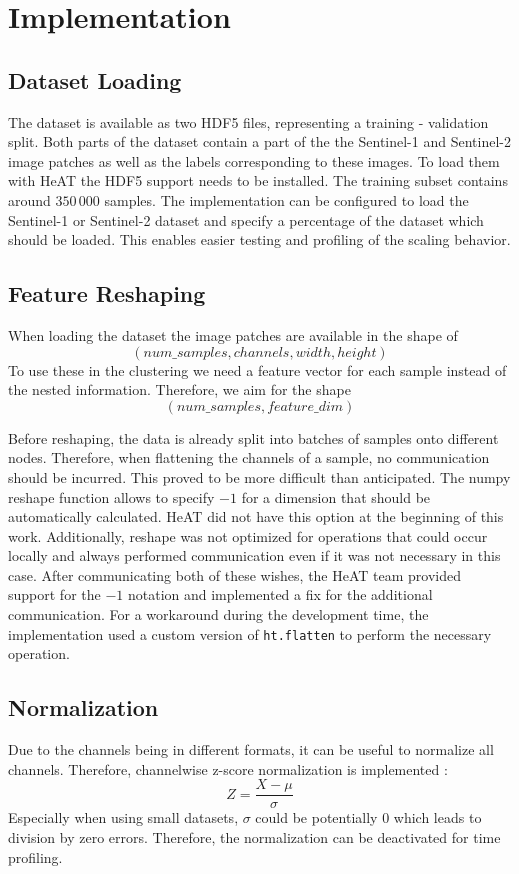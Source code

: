 \section{Implementation}
\label{sec:implementation}

\subsection{Dataset Loading}
\label{subsec:dataset_loading}
The dataset is available as two \gls{HDF5} files, representing a training - validation split.
Both parts of the dataset contain a part of the the Sentinel-1 and Sentinel-2 image patches as well as the labels corresponding to these images.
To load them with \gls{HeAT} the \gls{HDF5} support needs to be installed.
The training subset contains around \(350\,000\) samples.
The implementation can be configured to load the Sentinel-1 or Sentinel-2 dataset and specify a percentage of the dataset which should be loaded.
This enables easier testing and profiling of the scaling behavior.


\subsection{Feature Reshaping}
\label{subsec:feature_reshaping}
When loading the dataset the image patches are available in the shape of \[(num\_samples, channels, width, height)\]
To use these in the clustering we need a feature vector for each sample instead of the nested information. Therefore,
we aim for the shape \[(num\_samples, feature\_dim)\]

Before reshaping, the data is already split into batches of samples onto different nodes. Therefore, when flattening the channels of a sample, no communication should be incurred.
This proved to be more difficult than anticipated. The \gls{numpy} reshape function allows to specify \(-1\) for a dimension that should be automatically calculated.
\gls{HeAT} did not have this option at the beginning of this work.
Additionally, reshape was not optimized for operations that could occur locally and always performed communication even
if it was not necessary in this case. After communicating both of these wishes, the \gls{HeAT} team provided support for the \(-1\) notation and
implemented a fix for the additional communication.
For a workaround during the development time, the implementation used a custom version of \lstinline{ht.flatten} to perform the necessary operation.

\subsection{Normalization}
\label{subsec:normalization}
Due to the channels being in different formats, it can be useful to normalize all channels.
Therefore, channelwise z-score normalization is implemented \cite{wooldridge_introductory_2012}:
\[Z = \frac{X - \mu}{\sigma}\]
Especially when using small datasets, \(\sigma\) could be potentially \(0\) which leads to division by zero errors.
Therefore, the normalization can be deactivated for time profiling.


